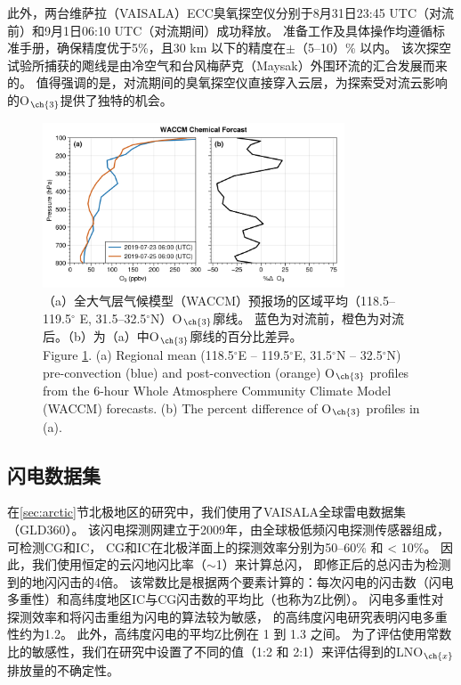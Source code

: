 此外，两台维萨拉（VAISALA）ECC臭氧探空仪分别于8月31日23:45 UTC（对流前）和9月1日06:10 UTC（对流期间）成功释放。
准备工作及具体操作均遵循标准手册，确保精度优于5\%，且30 km 以下的精度在$\pm$（5--10）\% 以内\citep{Smit.2007}。
该次探空试验所捕获的飑线是由冷空气和台风梅萨克（Maysak）外围环流的汇合发展而来的。
值得强调的是，对流期间的臭氧探空仪直接穿入云层，为探索受对流云影响的O$_{\ch{3}}$提供了独特的机会。

\begin{figure}[H]
\centering
\includegraphics[width=0.8\textwidth]{./figures/waccm_forcast_o3.png}
\caption{（a）全大气层气候模型（WACCM）预报场的区域平均（118.5--119.5$^{\circ}$ E, 31.5--32.5$^{\circ}$N）O$_{\ch{3}}$廓线。
蓝色为对流前，橙色为对流后。（b）为（a）中O$_{\ch{3}}$廓线的百分比差异。\\
Figure \ref{fig:waccm_forcast_o3}. (a) Regional mean (118.5$^{\circ}$E – 119.5$^{\circ}$E, 31.5$^{\circ}$N – 32.5$^{\circ}$N)
pre-convection (blue) and post-convection (orange) O$_{\ch{3}}$ profiles from the 6-hour Whole Atmosphere Community Climate Model (WACCM) forecasts.
(b) The percent difference of O$_{\ch{3}}$ profiles in (a).
}
\label{fig:waccm_forcast_o3}
\end{figure}

\subsection{闪电数据集}

在\ref{sec:arctic}节北极地区的研究中，我们使用了VAISALA全球雷电数据集（GLD360）。
该闪电探测网建立于2009年，由全球极低频闪电探测传感器组成，可检测CG和IC\citep{Said.2010,Said.2013,Said.2017}，
CG和IC在北极洋面上的探测效率分别为50--60\% 和 < 10\%\citep{Vagasky.2022}。
因此，我们使用恒定的云闪地闪比率（$\sim$1）来计算总闪，
即修正后的总闪击为检测到的地闪闪击的4倍\citep{Mackerras.1994,Prentice.1977}。
该常数比是根据两个要素计算的：每次闪电的闪击数（闪电多重性）和高纬度地区IC与CG闪击数的平均比（也称为Z比例）。
闪电多重性对探测效率和将闪击重组为闪电的算法较为敏感\citep{Schulz.2005,Yair.2014,Burgesser.2017,Kolmasova.2022}，
\citet{Yusop.2019}的高纬度闪电研究表明闪电多重性约为1.2。
此外，高纬度闪电的平均Z比例在 1 到 1.3 之间\citep{Mackerras.1994,Prentice.1977,Bandholnopparat.2020}。
为了评估使用常数比的敏感性，我们在研究中设置了不同的值（1:2 和 2:1）来评估得到的LNO$_{\ch{x}}$排放量的不确定性。


